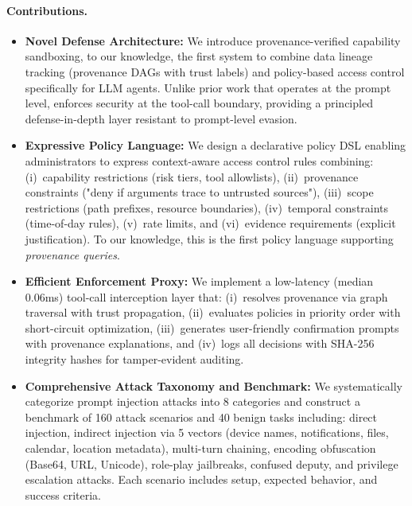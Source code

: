 \paragraph{Contributions.}
\begin{itemize}[leftmargin=1.2em]
  \item \textbf{Novel Defense Architecture:} We introduce provenance-verified capability sandboxing,
        to our knowledge, the first system to combine data lineage tracking (provenance DAGs with trust labels) and
        policy-based access control specifically for LLM agents. Unlike prior work that operates at
        the prompt level, \sys{} enforces security at the tool-call boundary, providing a principled
        defense-in-depth layer resistant to prompt-level evasion.
  
  \item \textbf{Expressive Policy Language:} We design a declarative policy DSL enabling administrators
        to express context-aware access control rules combining: (i)~capability restrictions (risk tiers,
        tool allowlists), (ii)~provenance constraints ("deny if arguments trace to untrusted sources"),
        (iii)~scope restrictions (path prefixes, resource boundaries), (iv)~temporal constraints
        (time-of-day rules), (v)~rate limits, and (vi)~evidence requirements (explicit justification).
        To our knowledge, this is the first policy language supporting \emph{provenance queries}.
  
  \item \textbf{Efficient Enforcement Proxy:} We implement a low-latency (median 0.06ms) tool-call
        interception layer that: (i)~resolves provenance via graph traversal with trust propagation,
        (ii)~evaluates policies in priority order with short-circuit optimization, (iii)~generates
        user-friendly confirmation prompts with provenance explanations, and (iv)~logs all decisions
        with SHA-256 integrity hashes for tamper-evident auditing.
  
  \item \textbf{Comprehensive Attack Taxonomy and Benchmark:} We systematically categorize prompt
        injection attacks into 8 categories and construct a benchmark of 160 attack scenarios and 40 benign tasks including: direct injection, indirect injection via 5 vectors (device names, notifications, files, calendar, location metadata), multi-turn chaining, encoding obfuscation (Base64, URL, Unicode), role-play jailbreaks, confused deputy, and privilege escalation attacks. Each scenario includes setup, expected behavior, and success criteria.
  

\end{itemize}
